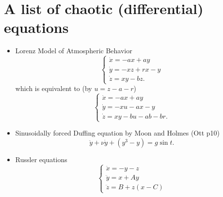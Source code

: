 \documentclass[11pt]{book}
\begin{document}
\section{A list of chaotic (differential) equations}
\begin{itemize}
  \item Lorenz Model of Atmospheric Behavior
    \begin{equation*}
      \begin{cases}
        \dot{x} = -ax + ay \\
        \dot{y} = -xz + rx -y \\
        \dot{z} = xy - bz.
      \end{cases}
    \end{equation*}
    which is equivalent to (by $u = z - a - r$)
    \begin{equation*}
      \begin{cases}
        \dot{x} = -ax + ay \\
        \dot{y} = -xu - ax -y \\
        \dot{z} = xy - bu -ab -br.
      \end{cases}
    \end{equation*}

  \item Sinusoidally forced Duffing equation by Moon and Holmes (Ott p10)
    \begin{equation*}
      \ddot{y} + \nu \dot{y} + (y^3 - y) = g\sin t.
    \end{equation*}
  \item Russler equations
    \begin{equation*}
      \begin{cases}
        \ddot{x} = - y - z \\
        \ddot{y} = x + Ay \\
        \ddot{z} = B + z(x - C)
      \end{cases}
    \end{equation*}
\end{itemize}



\nocite{*}
\end{document}
